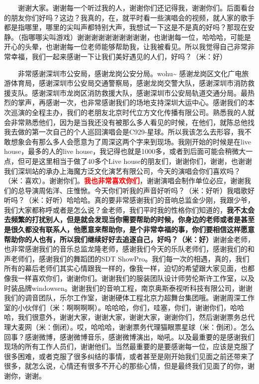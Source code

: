 \documentclass[]{ctexbook}
\begin{document}
  谢谢大家。谢谢每一个听过我的人，谢谢你们还记得我，谢谢你们。后面看台的朋友你们好吗？这边？我真的，在，就平时看一些演唱会的视频，就人家的歌手都是指哪里，哪里的尖叫声都特别大声，我想试一下这是不是真的好吗？那现在安静。（指哪哪尖叫游戏）谢谢谢谢谢谢谢谢谢谢，也谢谢每一位，哈哈哈，可能是开心的头晕，也谢谢每一位老师能够帮助我，让我被看见。所以我觉得自己非常非常幸福，我们一起来感谢一下让我们美好遇见的人们，好吗？（米：好）

  非常感谢深圳市公安局，感谢龙岗公安分局。wohu\textasciitilde{} 感谢龙岗区文化广电旅游体育局，感谢深圳市公安局交通警察局，感谢龙岗交警大队，感谢深圳市消防救援支队。感谢深圳市龙岗区消防救援大队，感谢深圳市公安局轨道交通分局。最热烈的掌声，再感谢一次，也非常感谢我们的场地支持深圳大运中心。感谢我们的本次巡演的全程主办，我们的老朋友北京时代立方文化传播有限公司。熟悉我的人就会非常熟悉他们，因为是当我还没有被那么多人看见的时候，在他们，就陈总他找我去做的第一次自己的个人巡回演唱会是C929-星球。所以我该怎么去形容，我不敢想象会有那么多人会愿意为了周深这两个字来到现场。我刚开始的时候是在live house，最多的人的live house，我记得也就是1000多，或者到后面可能会稍微大一点，但可是这里相当于做了40多个Live house的朋友们，谢谢你们，谢谢，也谢谢我们深圳站的承办上海魔方泛文化演艺有限公司，今天的演唱会你们喜欢吗？（米：喜欢）。谢谢你们。\textbf{\textcolor{red}{我也非常喜欢你们}}，谢谢演唱会制作单位必应，谢谢我们的总导演周佑洋、庄惟惞。今天你们听我的声音好听吗？（米：好听）我唱歌好听吗？（米：好听）哈哈哈。真的要非常感谢我们的音响总监金少刚，我跟少爷，我们大家都称呼或者是怎么说？金老师，我们平时我的性格你们知道的，\textbf{我不太会去频繁的打扰别人，但是就会发现当你需要帮助的时候，你身边的老师或者是甚至是很久都没有联系人，他愿意来帮助你，是个非常幸福的事，你们要相信这样愿意帮助你的人也有，所以我们继续好好去追逐自己，好吗？（米：好）}谢谢金老师，也非常感谢我们的音乐总监龙隆老师，感谢我们今天的乐队老师们，感谢我们的和声老师们，感谢我们的舞蹈团的SDT ShowPro。我们每一次的相遇，真的，我们所有的幕后老师们其实心情跟我一样的，像我一样，迫切的希望跟大家见面，也都像我一样喜欢你们，谢谢你们。谢谢我们的服装团队设计师劳伦斯许工作室，以及时装品牌windowsen。谢谢我们的音响工程，南京奥斯泰视听科技有限公司，谢谢我们的调音团队，乐尔工作室，谢谢硬体工程北京力超舞台集团哦。谢谢周深工作室的小伙伴们（米：啊啊啊啊）。哈哈哈，你们，哇塞，你们，谢谢你们，哈哈哈，我们很意外，谢谢大家，谢谢大家，谢谢大家，谢谢你们，然后谢谢票务总代理大麦网（米：倒闭）。哎，哈哈哈，谢谢票务代理猫眼票星球（米：倒闭）。怎么回事？感谢微博，感谢微博音乐，感谢微博演出，呦吼。以及最重要的是感谢我们现场的所有工作人员们，谢谢他们。当然最重要的是要感谢每一位，应该是克服了很多困难，或者克服了很多纠结的事情，或者甚至是刚开始我们见面之前还带来了很多，就怎么说，心情还有很多不开心的那些心情，但是最终我们见面了的你，谢谢你，谢谢。
\end{document}
